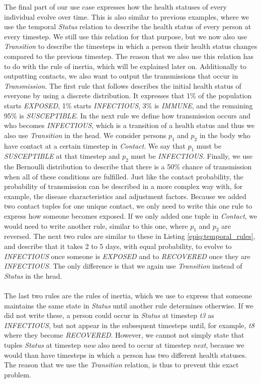 The final part of our use case expresses how the health statuses of every individual evolve over time. This is also similar to previous examples, where we use the temporal \textit{Status} relation to describe the health status of every person at every timestep. We still use this relation for that purpose, but we now also use \textit{Transition} to describe the timesteps in which a person their health status changes compared to the previous timestep. The reason that we also use this relation has to do with the rule of inertia, which will be explained later on. Additionally to outputting contacts, we also want to output the transmissions that occur in \textit{Transmission}. The first rule that follows describes the initial health status of everyone by using a discrete distribution. It expresses that 1\% of the population starts \textit{EXPOSED}, 1\% starts \textit{INFECTIOUS}, 3\% is \textit{IMMUNE}, and the remaining 95\% is \textit{SUSCEPTIBLE}. In the next rule we define how transmission occurs and who becomes \textit{INFECTIOUS}, which is a transition of a health status and thus we also use \textit{Transition} in the head. We consider persons $p_{1}$ and $p_{2}$ in the body who have contact at a certain timestep in \textit{Contact}. We say that $p_{1}$ must be \textit{SUSCEPTIBLE} at that timestep and $p_{2}$ must be \textit{INFECTIOUS}. Finally, we use the Bernoulli distribution to describe that there is a 50\% chance of transmission when all of these conditions are fulfilled. Just like the contact probability, the probability of transmission can be described in a more complex way with, for example, the disease characteristics and adjustment factors. Because we added two contact tuples for one unique contact, we only need to write this one rule to express how someone becomes exposed. If we only added one tuple in \textit{Contact}, we would need to write another rule, similar to this one, where $p_{1}$ and $p_{2}$ are reversed. The next two rules are similar to these in Listing \ref{epiq:temporal_rules}, and describe that it takes 2 to 5 days, with equal probability, to evolve to \textit{INFECTIOUS} once someone is \textit{EXPOSED} and to \textit{RECOVERED} once they are \textit{INFECTIOUS}. The only difference is that we again use \textit{Transition} instead of \textit{Status} in the head.
\\\\
The last two rules are the rules of inertia, which we use to express that someone maintains the same state in \textit{Status} until another rule determines otherwise. If we did not write these, a person could occur in \textit{Status} at timestep \textit{t3} as \textit{INFECTIOUS}, but not appear in the subsequent timesteps until, for example, \textit{t8} where they become \textit{RECOVERED}. However, we cannot not simply state that tuples \textit{Status} at timestep \textit{now} also need to occur at timestep \textit{next}, because we would than have timesteps in which a person has two different health statuses. The reason that we use the \textit{Transition} relation, is thus to prevent this exact problem.
